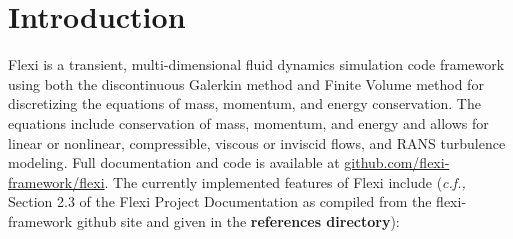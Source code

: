 
\section{Introduction}\label{sec:Intro}

Flexi\cite{flexigeneral} is a transient, multi-dimensional fluid dynamics simulation code framework using both the discontinuous Galerkin method and Finite Volume method for discretizing the equations of mass, momentum, and energy conservation.  The equations include conservation of mass, momentum, and energy and allows for linear or nonlinear, compressible, viscous or inviscid flows, and RANS turbulence modeling\cite{flexiles}.  Full documentation and code is available at \url{github.com/flexi-framework/flexi}. The currently implemented features of Flexi include (\textit{c.f.,} Section 2.3 of the Flexi Project Documentation as compiled from the flexi-framework github site and given in the \textbf{references directory}):

